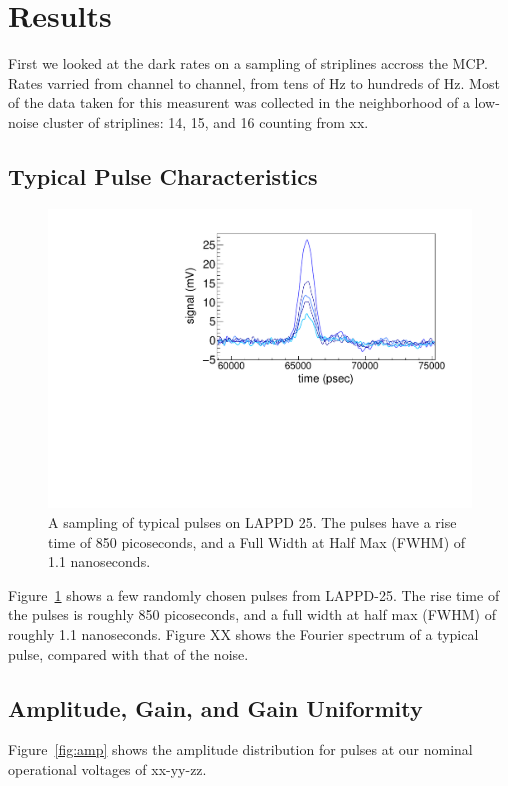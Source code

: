 \documentclass[preprint,12pt]{elsarticle}
\begin{document}
\section{Results}
\label{sec:Results}

\noindent First we looked at the dark rates on a sampling of striplines accross the MCP.  Rates varried from channel to channel, from tens of Hz to hundreds of Hz. Most of the data taken for this measurent was collected in the neighborhood of a low-noise cluster of striplines: 14, 15, and 16 counting from xx.\\

\subsection{Typical Pulse Characteristics}

\begin{figure}[h]
	\centering
       \includegraphics[width=0.75 \linewidth]{plots/TypicalPulses}
       \caption{A sampling of typical pulses on LAPPD 25. The pulses have a rise time of 850 picoseconds, and a Full Width at Half Max (FWHM) of 1.1 nanoseconds.}
	\label{fig:typicalpulses}
\end{figure}

Figure~\ref{fig:typicalpulses} shows a few randomly chosen pulses from LAPPD-25. The rise time of the pulses is roughly 850 picoseconds, and a full width at half max (FWHM) of roughly 1.1 nanoseconds. Figure XX shows the Fourier spectrum of a typical pulse, compared with that of the noise. 

\subsection{Amplitude, Gain, and Gain Uniformity}

Figure~\ref{fig:amp} shows the amplitude distribution for pulses at our nominal operational voltages of xx-yy-zz. 
\end{document}
